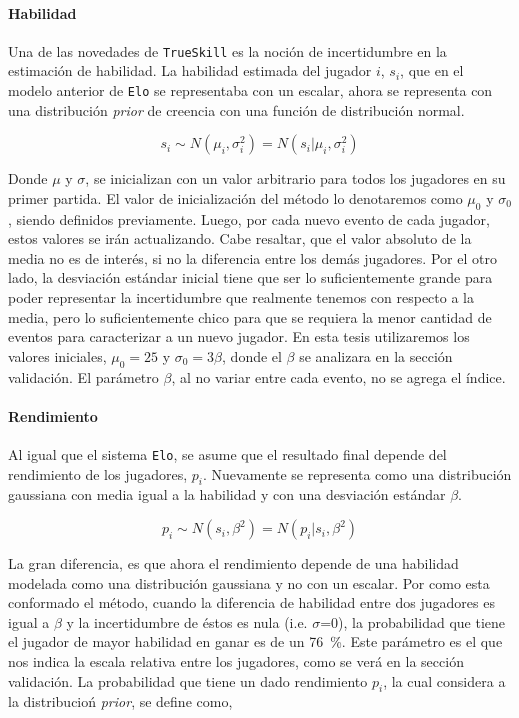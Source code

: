 \documentclass[11pt,twoside,spanish]{report} %
\begin{document}
\paragraph{Habilidad}
Una de las novedades de \texttt{TrueSkill} es la noci\'on de incertidumbre en la estimaci\'on de habilidad.
La habilidad estimada del jugador $i$,  $s_i$, que en el modelo anterior de \texttt{Elo} se representaba con un escalar, ahora se representa con una distribuci\'on \textit{prior} de creencia con una funci\'on de distribuci\'on normal.

\begin{equation}
s_i \sim N(\mu_i, \sigma_i^2) = N(s_i|\mu_i, \sigma_i^2)
\end{equation}

Donde $\mu$ y $\sigma$, se inicializan con un valor arbitrario para todos los jugadores en su primer partida.
El valor de inicializaci\'on del m\'etodo lo denotaremos como $\mu_0$ y $\sigma_0$, siendo definidos previamente.
Luego, por cada nuevo evento de cada jugador, estos valores se ir\'an actualizando.
Cabe resaltar, que el valor absoluto de la media no es de inter\'es, si no la diferencia entre los dem\'as jugadores.
Por el otro lado, la desviaci\'on est\'andar inicial tiene que ser lo suficientemente grande para poder representar la incertidumbre que realmente tenemos con respecto a la media, pero lo suficientemente chico para que se requiera la menor cantidad de eventos para caracterizar a un nuevo jugador.
En esta tesis utilizaremos los valores iniciales, $ \mu_0 = 25 $ y $ \sigma_0=3\beta$, donde el $\beta$ se analizara en la secci\'on validaci\'on.
El par\'ametro $\beta$, al no variar entre cada evento, no se agrega el \'indice.



\paragraph{Rendimiento}
Al igual que el sistema \texttt{Elo}, se asume que el resultado final depende del rendimiento de los jugadores, $p_i$.
Nuevamente se representa como una distribuci\'on gaussiana con media igual a la habilidad y con una desviaci\'on est\'andar $\beta$.

\begin{equation}
p_i \sim N(s_i, \beta^2) = N(p_i|s_i, \beta^2)
\end{equation}

La gran diferencia, es que ahora el rendimiento depende de una habilidad modelada como una distribuci\'on gaussiana y no con un escalar.
Por como esta conformado el m\'etodo, cuando la diferencia de habilidad entre dos jugadores es igual a $\beta$ y la incertidumbre de \'estos es nula (i.e. $\sigma$=0), la probabilidad que tiene el jugador de mayor habilidad en ganar es de un \SI{76}{\percent}.
Este par\'ametro es el que nos indica la escala relativa entre los jugadores, como se ver\'a en la secci\'on validaci\'on.
La probabilidad  que tiene un dado rendimiento $p_i$, la cual considera a la distribucio\'n  \textit{prior}, se define como,
\end{document}
